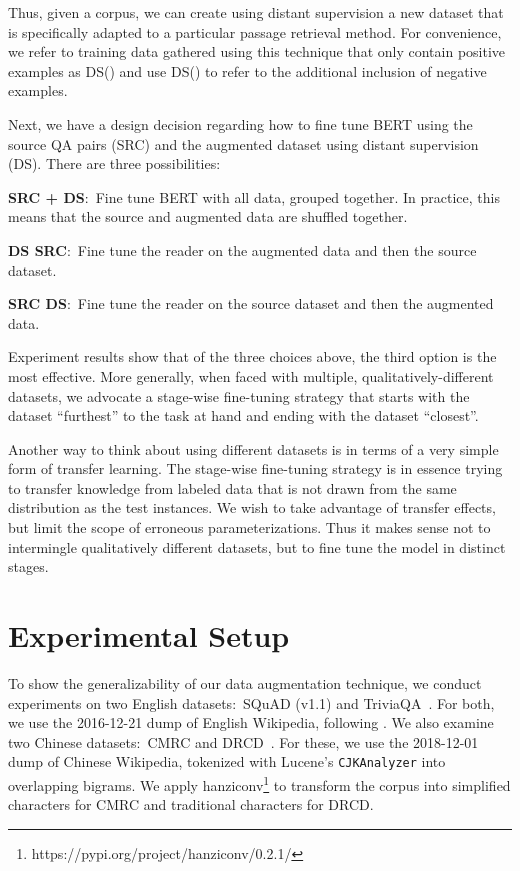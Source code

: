 \documentclass[11pt,a4paper]{article}
\begin{document}
Thus, given a corpus, we can create using distant supervision a new dataset that is specifically adapted to a particular passage retrieval method.
For convenience, we refer to training data gathered using this technique that only contain positive examples as DS() and use DS() to refer to the additional inclusion of negative examples.

Next, we have a design decision regarding how to fine tune BERT using the source QA pairs (SRC) and the augmented dataset using distant supervision (DS).
There are three possibilities:

\smallskip \noindent \textbf{SRC + DS}:\
Fine tune BERT with all data, grouped together.
In practice, this means that the source and augmented data are shuffled together.

\smallskip \noindent \textbf{DS  SRC}:\
Fine tune the reader on the augmented data and then the source dataset.

\smallskip \noindent \textbf{SRC  DS}:\
Fine tune the reader on the source dataset and then the augmented data.

\smallskip \noindent
Experiment results show that of the three choices above, the third option is the most effective.
More generally, when faced with multiple, qualitatively-different datasets, we advocate a stage-wise fine-tuning strategy that starts with the dataset ``furthest'' to the task at hand and ending with the dataset ``closest''.

Another way to think about using different datasets is in terms of a very simple form of transfer learning.
The stage-wise fine-tuning strategy is in essence trying to transfer knowledge from labeled data that is not drawn from the same distribution as the test instances.
We wish to take advantage of transfer effects, but limit the scope of erroneous parameterizations.
Thus it makes sense not to intermingle qualitatively different datasets, but to fine tune the model in distinct stages.

\section{Experimental Setup}
\label{sec:setup}

To show the generalizability of our data augmentation technique, we conduct experiments on two English datasets:\ SQuAD (v1.1) and Trivia\-QA~\cite{P17-1147}.
For both, we use the 2016-12-21 dump of English Wikipedia, following \citet{P17-1171}.
We also examine two Chinese datasets:\ CMRC \cite{cui2018span} and DRCD~\cite{shao2018drcd}.
For these, we use the 2018-12-01 dump of Chinese Wikipedia, tokenized with Lucene's \texttt{CJKAnalyzer} into overlapping bigrams.
We apply hanziconv\footnote{https://pypi.org/project/hanziconv/0.2.1/} to transform the corpus into simplified characters for CMRC and traditional characters for DRCD.
\end{document}
